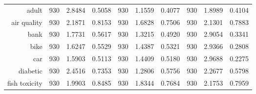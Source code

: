 \begin{table}[htbp]
{\begin{tabular}{rccccccccc}
			adult                               & 930                                         & 2.8484                                                                    & 0.5058          & 930            & \cellcolor[rgb]{ .776,  .937,  .808}\textcolor[rgb]{ 0,  .38,  0}{1.1559}          & 0.4077          & 930            & 1.8989          & 0.4104          \\
			air quality                         & 930                                         & 2.1871                                                                    & 0.8153          & 930            & \cellcolor[rgb]{ .776,  .937,  .808}\textcolor[rgb]{ 0,  .38,  0}{1.6828}          & 0.7506          & 930            & 2.1301          & 0.7883          \\
			bank                                & 930                                         & 1.7731                                                                    & 0.5617          & 930            & \cellcolor[rgb]{ .776,  .937,  .808}\textcolor[rgb]{ 0,  .38,  0}{1.3215}          & 0.4920          & 930            & 2.9054          & 0.3341          \\
			bike                                & 930                                         & 1.6247                                                                    & 0.5529          & 930            & \cellcolor[rgb]{ .776,  .937,  .808}\textcolor[rgb]{ 0,  .38,  0}{1.4387}          & 0.5321          & 930            & 2.9366          & 0.2808          \\
			car                                 & 930                                         & 1.5903                                                                    & 0.5113          & 930            & \cellcolor[rgb]{ .776,  .937,  .808}\textcolor[rgb]{ 0,  .38,  0}{1.4409}          & 0.5180          & 930            & 2.9688          & 0.2275          \\
			diabetic                            & 930                                         & 2.4516                                                                    & 0.7353          & 930            & \cellcolor[rgb]{ .776,  .937,  .808}\textcolor[rgb]{ 0,  .38,  0}{1.2806}          & 0.5756          & 930            & 2.2677          & 0.5798          \\
			fish toxicity                       & 930                                         & 1.9903                                                                    & 0.8485          & 930            & \cellcolor[rgb]{ .776,  .937,  .808}\textcolor[rgb]{ 0,  .38,  0}{1.8344}          & 0.7684          & 930            & 2.1753          & 0.7959          \\

\end{tabular}}
\end{table}
